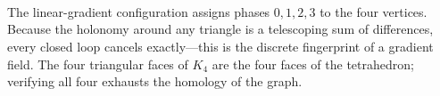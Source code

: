 \documentclass[11pt,a4paper]{book}
\begin{document}
\begin{code}
\AgdaSpace{}%
\AgdaSymbol{(}\AgdaSpace{}%
\AgdaSpace{}%
\AgdaSymbol{(}\AgdaSpace{}%
\AgdaSpace{}%
\AgdaSymbol{))}\AgdaSpace{}%
\AgdaSymbol{=}\<%
\\
\>[0][@{}l@{\AgdaIndent{0}}]%
\>[2]\AgdaSpace{}%
\AgdaSpace{}%
\AgdaSpace{}%
\AgdaSpace{}%
\AgdaSpace{}%
\AgdaSpace{}%
\AgdaSpace{}%
\AgdaSymbol{(}\AgdaSpace{}%
\AgdaSpace{}%
\AgdaSymbol{)}\<%
\\
%
\\[\AgdaEmptyExtraSkip]%
\>[0]\<%
\\
\>[0]\AgdaSpace{}%
\AgdaSymbol{:}\AgdaSpace{}%
\<%
\\
\>[0]\AgdaSpace{}%
\AgdaSpace{}%
\AgdaSymbol{=}\AgdaSpace{}%
\<%
\\
\>[0]\AgdaSpace{}%
\AgdaSpace{}%
\AgdaSymbol{=}\AgdaSpace{}%
\AgdaSpace{}%
%
\>[39]\<%
\\
\>[0]\AgdaSpace{}%
\AgdaSpace{}%
\AgdaSymbol{=}\AgdaSpace{}%
\AgdaSpace{}%
\AgdaSymbol{(}\AgdaSpace{}%
\AgdaSymbol{)}\AgdaSpace{}%
\<%
\\
\>[0]\AgdaSpace{}%
\AgdaSpace{}%
\AgdaSymbol{=}\AgdaSpace{}%
\AgdaSpace{}%
\AgdaSymbol{(}\AgdaSpace{}%
\AgdaSymbol{(}\AgdaSpace{}%
\AgdaSymbol{))}%
\>[47]\<%
\end{code}

The linear-gradient configuration assigns phases $0, 1, 2, 3$ to the
four vertices. Because the holonomy around any triangle is a telescoping
sum of differences, every closed loop cancels exactly---this is the
discrete fingerprint of a gradient field. The four triangular faces of
$K_4$ are the four faces of the tetrahedron; verifying all four
exhausts the homology of the graph.
\end{document}
